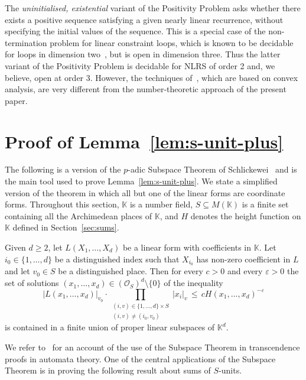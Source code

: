 \documentclass[a4paper,UKenglish,cleveref, autoref, thm-restate]{lipics-v2021}
\begin{document}
The \emph{uninitialised, existential} variant of the Positivity Problem asks whether there exists a positive sequence satisfying a given nearly linear recurrence, without specifying the
initial values of the sequence.  This is a special case of the non-termination problem for linear constraint loops, which
is known to be decidable for loops in dimension two~\cite{GuilmantLO024}, but is open in dimension three.   Thus the latter variant of the Positivity Problem is decidable
for NLRS of order 2 and, we believe, open at order 3.  However, 
the techniques of~\cite{GuilmantLO024}, which are based on convex analysis, are very different from the number-theoretic approach of the present paper.


\appendix
\section{Proof of Lemma~\ref{lem:s-unit-plus}}
\label{sec:proofs}
The following is a version of the $p$-adic Subspace Theorem of
Schlickewei~\cite{Schlickewei76} and is the main tool used to prove Lemma~\ref{lem:s-unit-plus}.
We state a simplified version of the theorem in which all but one of the linear forms are 
  coordinate forms.  Throughout this section, $\mathbb K$ is a number field,
  $S \subseteq M(\mathbb K)$ is a finite set
containing all the Archimedean places of $\mathbb K$, 
  and $H$ denotes the height function on $\mathbb K$ defined in Section~\ref{sec:sums}.
  
\begin{theorem}
Given  $d\geq 2$, let $L(X_1,\ldots,X_d)$ be a linear form with
  coefficients in $\mathbb K$.  Let $i_0 \in \{1,\ldots,d\}$ be a distinguished
  index such that $X_{i_0}$ has non-zero coefficient in $L$ and let $v_0 \in S$ be a distinguished place.  
  Then for
  every $c>0$ and every $\varepsilon>0$ the set of solutions
  $(x_1,\ldots,x_d) \in (\mathcal{O}_S)^d\setminus\{0\}$ of the
  inequality
  \[ |L(x_1,\ldots,x_d)|_{v_0}\cdot  \prod_{\substack{(i,v)\in
        \{1,\ldots,d\}\times S\\(i,v) \neq (i_0,v_0)}}|x_i|_v \,
    \leq \, c H(x_1,\ldots,x_d)^{-\varepsilon} \] is contained in a finite union
  of proper linear subspaces of $\mathbb K^d$.
\label{thm:SUBSPACE}
\end{theorem}

We refer to~\cite[Section 4]{AdamczewskiBell21} for an 
account of the use of the Subspace Theorem in transcendence proofs in 
automata theory.  One of the central applications of the Subspace Theorem is in proving the following result 
about sums of $S$-units.
\end{document}
